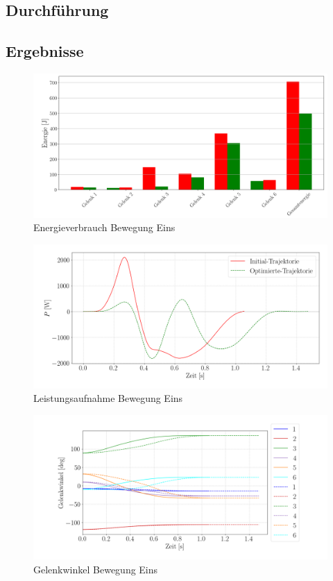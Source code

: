 \subsection{Durchführung}
\subsection{Ergebnisse}
\begin{figure}[tbph]
	\centering
	\includegraphics[width=1\linewidth]{images/e_down500}
	\caption{Energieverbrauch Bewegung Eins}
	\label{fig:edown500}
\end{figure}
\begin{figure}[tbph]
	\centering
	\includegraphics[width=1\linewidth]{images/P_down}
	\caption{Leistungsaufnahme Bewegung Eins}
	\label{fig:pdown}
\end{figure}
\begin{figure}[tbph]
	\centering
	\includegraphics[width=1\linewidth]{images/aiposdown}
	\caption{Gelenkwinkel Bewegung Eins}
	\label{fig:aiposdown}
\end{figure}
